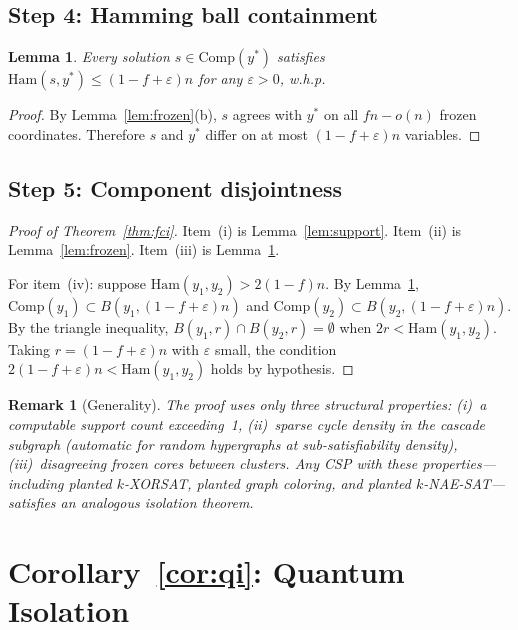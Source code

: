 \documentclass[11pt]{article}
\newtheorem{lemma}[theorem]{Lemma}
\newtheorem{remark}[theorem]{Remark}
\begin{document}
\subsection{Step 4: Hamming ball containment}

\begin{lemma}\label{lem:hamming}
Every solution $s \in \mathrm{Comp}(y^*)$ satisfies $\mathrm{Ham}(s, y^*) \leq (1 - f + \varepsilon)n$ for any $\varepsilon > 0$, w.h.p.
\end{lemma}

\begin{proof}
By Lemma~\ref{lem:frozen}(b), $s$ agrees with $y^*$ on all $fn - o(n)$ frozen coordinates.  Therefore $s$ and $y^*$ differ on at most $(1 - f + \varepsilon)n$ variables.
\end{proof}


\subsection{Step 5: Component disjointness}

\begin{proof}[Proof of Theorem~\ref{thm:fci}]
Item~(i) is Lemma~\ref{lem:support}.  Item~(ii) is Lemma~\ref{lem:frozen}.  Item~(iii) is Lemma~\ref{lem:hamming}.

For item~(iv): suppose $\mathrm{Ham}(y_1, y_2) > 2(1-f)n$.  By Lemma~\ref{lem:hamming}, $\mathrm{Comp}(y_1) \subset B(y_1, (1-f+\varepsilon)n)$ and $\mathrm{Comp}(y_2) \subset B(y_2, (1-f+\varepsilon)n)$.  By the triangle inequality, $B(y_1, r) \cap B(y_2, r) = \emptyset$ when $2r < \mathrm{Ham}(y_1, y_2)$.  Taking $r = (1-f+\varepsilon)n$ with $\varepsilon$ small, the condition $2(1-f+\varepsilon)n < \mathrm{Ham}(y_1, y_2)$ holds by hypothesis.
\end{proof}

\begin{remark}[Generality]\label{rem:general}
The proof uses only three structural properties: (i)~a computable support count exceeding~1, (ii)~sparse cycle density in the cascade subgraph (automatic for random hypergraphs at sub-satisfiability density), (iii)~disagreeing frozen cores between clusters.  Any CSP with these properties---including planted $k$-XORSAT, planted graph coloring, and planted $k$-NAE-SAT---satisfies an analogous isolation theorem.
\end{remark}


\section{Corollary~\ref{cor:qi}: Quantum Isolation}
\end{document}
